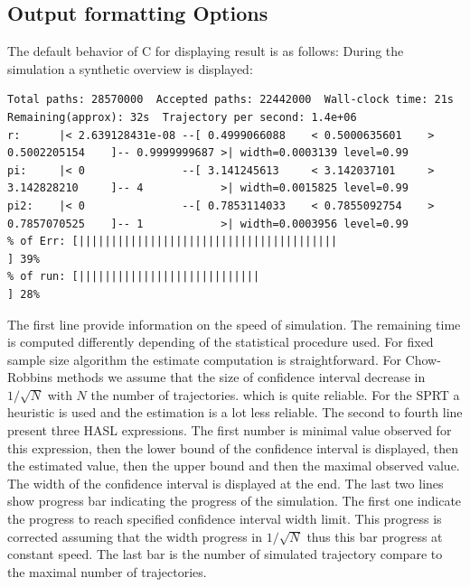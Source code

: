 \documentclass{article}
\newcommand{\cosmos}{\mbox{\textup{C}\scalebox{0.75}{{\textsc{OSMOS}}}}}
\begin{document}
\subsection{Output formatting Options}
The default behavior of \cosmos{} for displaying result is as follows:
During the simulation a synthetic overview is displayed:
\begin{scriptsize}
\begin{verbatim}
Total paths: 28570000  Accepted paths: 22442000  Wall-clock time: 21s  Remaining(approx): 32s  Trajectory per second: 1.4e+06
r:      |< 2.639128431e-08 --[ 0.4999066088    < 0.5000635601    > 0.5002205154    ]-- 0.9999999687 >| width=0.0003139 level=0.99
pi:     |< 0               --[ 3.141245613     < 3.142037101     > 3.142828210     ]-- 4            >| width=0.0015825 level=0.99
pi2:    |< 0               --[ 0.7853114033    < 0.7855092754    > 0.7857070525    ]-- 1            >| width=0.0003956 level=0.99
% of Err: [||||||||||||||||||||||||||||||||||||||||                                                       ] 39%	
% of run: [||||||||||||||||||||||||||||                                                                   ] 28%	
\end{verbatim}
\end{scriptsize}
The first line provide information on the speed of simulation. The
remaining time is computed differently depending of the statistical
procedure used. For fixed sample size algorithm the estimate computation
is straightforward. For Chow-Robbins methods
we assume that the size of confidence
interval decrease in $1/\sqrt{N}$ with $N$ the number of trajectories.
which is quite reliable. For the SPRT a heuristic is used and the 
estimation is a lot less reliable.
The second to fourth line present three HASL expressions. The first
number is minimal value observed for this expression, then the lower
bound of the confidence interval is displayed, then the estimated
value, then the upper bound and then the maximal observed value. The
width of the confidence interval is displayed at the end.  The last
two lines show progress bar indicating the progress of the
simulation. The first one indicate the progress to reach specified
confidence interval width limit. This progress is corrected assuming
that the width progress in $1/\sqrt{N}$ thus this bar progress at
constant speed. The last bar is the number of simulated trajectory 
compare to the maximal number of trajectories.
\end{document}
